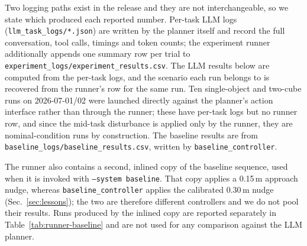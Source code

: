 Two logging paths exist in the release and they are not interchangeable, so
we state which produced each reported number. Per-task LLM logs
(\texttt{llm\_task\_logs/*.json}) are written by the planner itself and
record the full conversation, tool calls, timings and token counts; the
experiment runner additionally appends one summary row per trial to
\texttt{experiment\_logs/experiment\_results.csv}. The LLM results below are
computed from the per-task logs, and the scenario each run belongs to is
recovered from the runner's row for the same run. Ten single-object and
two-cube runs on 2026-07-01/02 were launched directly against the planner's
action interface rather than through the runner; these have per-task logs but
no runner row, and since the mid-task disturbance is applied only by the
runner, they are nominal-condition runs by construction. The baseline results
are from \texttt{baseline\_logs/baseline\_results.csv}, written by
\texttt{baseline\_controller}.

The runner also contains a second, inlined copy of the baseline sequence,
used when it is invoked with \texttt{--system baseline}. That copy applies a
0.15\,m approach nudge, whereas \texttt{baseline\_controller} applies the
calibrated 0.30\,m nudge (Sec.~\ref{sec:lessons}); the two are therefore
different controllers and we do not pool their results. Runs produced by the
inlined copy are reported separately in Table~\ref{tab:runner-baseline} and
are not used for any comparison against the LLM planner.



